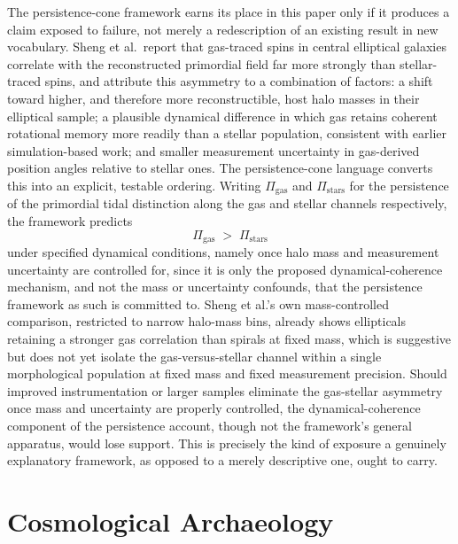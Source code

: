 \documentclass[11pt]{article}
\begin{document}
The persistence-cone framework earns its place in this paper only if it produces a claim exposed to failure, not merely a redescription of an existing result in new vocabulary. Sheng et al.\ report that gas-traced spins in central elliptical galaxies correlate with the reconstructed primordial field far more strongly than stellar-traced spins, and attribute this asymmetry to a combination of factors: a shift toward higher, and therefore more reconstructible, host halo masses in their elliptical sample; a plausible dynamical difference in which gas retains coherent rotational memory more readily than a stellar population, consistent with earlier simulation-based work; and smaller measurement uncertainty in gas-derived position angles relative to stellar ones. The persistence-cone language converts this into an explicit, testable ordering. Writing $\Pi_{\mathrm{gas}}$ and $\Pi_{\mathrm{stars}}$ for the persistence of the primordial tidal distinction along the gas and stellar channels respectively, the framework predicts
\begin{equation}
\Pi_{\mathrm{gas}} \;>\; \Pi_{\mathrm{stars}}
\end{equation}
under specified dynamical conditions, namely once halo mass and measurement uncertainty are controlled for, since it is only the proposed dynamical-coherence mechanism, and not the mass or uncertainty confounds, that the persistence framework as such is committed to. Sheng et al.'s own mass-controlled comparison, restricted to narrow halo-mass bins, already shows ellipticals retaining a stronger gas correlation than spirals at fixed mass, which is suggestive but does not yet isolate the gas-versus-stellar channel within a single morphological population at fixed mass and fixed measurement precision. Should improved instrumentation or larger samples eliminate the gas-stellar asymmetry once mass and uncertainty are properly controlled, the dynamical-coherence component of the persistence account, though not the framework's general apparatus, would lose support. This is precisely the kind of exposure a genuinely explanatory framework, as opposed to a merely descriptive one, ought to carry.

\section{Cosmological Archaeology}
\end{document}
